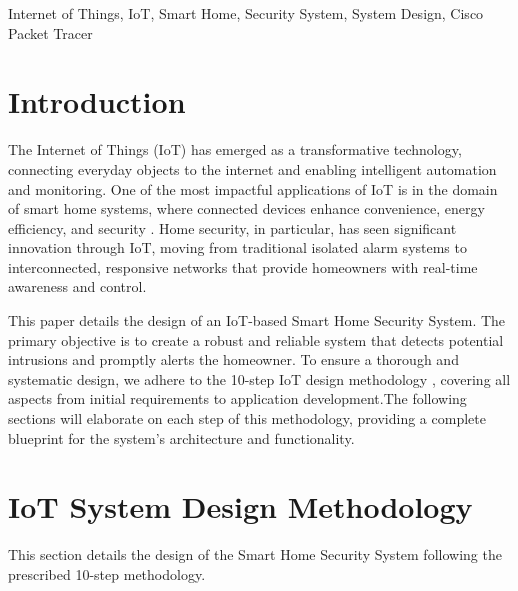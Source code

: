 \documentclass[conference]{IEEEtran}
\begin{document}
\begin{IEEEkeywords}
Internet of Things, IoT, Smart Home, Security System, System Design, Cisco Packet Tracer
\end{IEEEkeywords}



\section{Introduction}

The Internet of Things (IoT) has emerged as a transformative technology, connecting everyday objects to the internet and enabling intelligent automation and monitoring\cite{startertutorials_IoT_methodology, achtaich2021guidelines, seerangan_domain_specific_iot_home_automation_2022, article_S266729522100026X}. One of the most impactful applications of IoT is in the domain of smart home systems, where connected devices enhance convenience, energy efficiency, and security \cite{yamini_home_intrusion_2016, design_implementation_smart_home_IoT_2024, sharma_iot_based_smart_home_automation_2020, zwemer_smart_home_iot_part2_2015}. Home security, in particular, has seen significant innovation through IoT, moving from traditional isolated alarm systems to interconnected, responsive networks that provide homeowners with real-time awareness and control\cite{tipirisetty_home_automation_case_study_2025, startertutorials_IoT_methodology}.

This paper details the design of an IoT-based Smart Home Security System. The primary objective is to create a robust and reliable system that detects potential intrusions and promptly alerts the homeowner. To ensure a thorough and systematic design, we adhere to the 10-step IoT design methodology \cite{seerangan_domain_specific_iot_home_automation_2022}, covering all aspects from initial requirements to application development.The following sections will elaborate on each step of this methodology, providing a complete blueprint for the system's architecture and functionality.


\section{IoT System Design Methodology}
This section details the design of the Smart Home Security System following the prescribed 10-step methodology.
\end{document}
